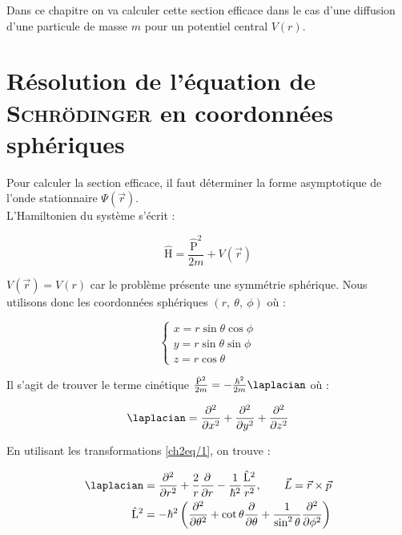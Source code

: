 \documentclass[12pt,a4paper,oneside,french]{book}
\newcommand{\opr}[1]{\mathrm{\hat{#1}}}
\theoremstyle{definition}
\theoremstyle{definition}
\theoremstyle{definition}
\theoremstyle{remark}
\theoremstyle{definition}
\begin{document}
    Dans ce chapitre on va calculer cette section efficace dans le cas d'une diffusion d'une particule de masse $m$ pour un potentiel central $V(r)$.
    
    \section{Résolution de l'équation de \textsc{Schrödinger} en coordonnées sphériques}
    Pour calculer la section efficace, il faut déterminer la forme asymptotique de l'onde stationnaire $\Psi(\vec{r})$. \\
    
    L'Hamiltonien du système s'écrit :
    
    \begin{equation*}
        \opr{H} = \frac{{\opr{P}}^{2}}{2 m} + V(\vec{r})
    \end{equation*}
    
    $V(\vec{r}) = V(r)$ car le problème présente une symmétrie sphérique. Nous utilisons donc les coordonnées sphériques $(r, \ \theta, \ \phi)$ où :
    
    \begin{equation} \label{ch2eq/1}
    \begin{cases}
        x = r \sin{\theta} \cos{\phi} \\
        y = r \sin{\theta} \sin{\phi} \\
        z = r \cos{\theta}
    \end{cases}
    \end{equation}
    
    Il s'agit de trouver le terme cinétique $\frac{{\opr{P}}^{2}}{2 m} = -\frac{{\hbar}^{2}}{2 m} \laplacian$ où : 
    
    \begin{equation*}
        \laplacian = \frac{{\partial}^{2}}{\partial {x}^{2}} + \frac{{\partial}^{2}}{\partial {y}^{2}} + \frac{{\partial}^{2}}{\partial {z}^{2}}
    \end{equation*}
    
    En utilisant les transformations \eqref{ch2eq/1}, on trouve :
    
    \begin{align*}
    \begin{split}
        \laplacian &= \frac{{\partial}^{2}}{\partial {r}^{2}} + \frac{2}{r} \frac{\partial}{\partial r} - \frac{1}{{\hbar}^{2}} \frac{{\opr{L}}^{2}}{{r}^{2}}, \qquad \vec{L} = \vec{r} \times \vec{p} \\
        {\opr{L}}^{2} &= - {\hbar}^{2} \left(\frac{{\partial}^{2}}{\partial {\theta}^{2}} + \cot{\theta} \frac{\partial}{\partial \theta} + \frac{1}{\sin^2 \theta} \frac{{\partial}^{2}}{\partial {\phi}^{2}}\right)
    \end{split}
    \end{align*}
    
\end{document}
